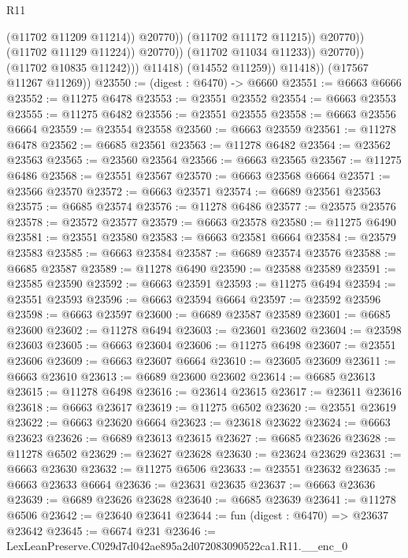 \begin{lexlean}{R11}
\begin{coremodule}
                                          (@11702 @11209 @11214))
                                        @20770))
                                    (@11702 @11172 @11215))
                                  @20770))
                              (@11702 @11129 @11224))
                            @20770))
                        (@11702 @11034 @11233))
                      @20770))
                  (@11702 @10835 @11242)))
              @11418)
            (@14552 @11259))
          @11418))
      (@17567 @11267 @11269))
@23550 := (digest : @6470) -> @6660
@23551 := @6663 @6666
@23552 := @11275 @6478
@23553 := @23551 @23552
@23554 := @6663 @23553
@23555 := @11275 @6482
@23556 := @23551 @23555
@23558 := @6663 @23556 @6664
@23559 := @23554 @23558
@23560 := @6663 @23559
@23561 := @11278 @6478
@23562 := @6685 @23561
@23563 := @11278 @6482
@23564 := @23562 @23563
@23565 := @23560 @23564
@23566 := @6663 @23565
@23567 := @11275 @6486
@23568 := @23551 @23567
@23570 := @6663 @23568 @6664
@23571 := @23566 @23570
@23572 := @6663 @23571
@23574 := @6689 @23561 @23563
@23575 := @6685 @23574
@23576 := @11278 @6486
@23577 := @23575 @23576
@23578 := @23572 @23577
@23579 := @6663 @23578
@23580 := @11275 @6490
@23581 := @23551 @23580
@23583 := @6663 @23581 @6664
@23584 := @23579 @23583
@23585 := @6663 @23584
@23587 := @6689 @23574 @23576
@23588 := @6685 @23587
@23589 := @11278 @6490
@23590 := @23588 @23589
@23591 := @23585 @23590
@23592 := @6663 @23591
@23593 := @11275 @6494
@23594 := @23551 @23593
@23596 := @6663 @23594 @6664
@23597 := @23592 @23596
@23598 := @6663 @23597
@23600 := @6689 @23587 @23589
@23601 := @6685 @23600
@23602 := @11278 @6494
@23603 := @23601 @23602
@23604 := @23598 @23603
@23605 := @6663 @23604
@23606 := @11275 @6498
@23607 := @23551 @23606
@23609 := @6663 @23607 @6664
@23610 := @23605 @23609
@23611 := @6663 @23610
@23613 := @6689 @23600 @23602
@23614 := @6685 @23613
@23615 := @11278 @6498
@23616 := @23614 @23615
@23617 := @23611 @23616
@23618 := @6663 @23617
@23619 := @11275 @6502
@23620 := @23551 @23619
@23622 := @6663 @23620 @6664
@23623 := @23618 @23622
@23624 := @6663 @23623
@23626 := @6689 @23613 @23615
@23627 := @6685 @23626
@23628 := @11278 @6502
@23629 := @23627 @23628
@23630 := @23624 @23629
@23631 := @6663 @23630
@23632 := @11275 @6506
@23633 := @23551 @23632
@23635 := @6663 @23633 @6664
@23636 := @23631 @23635
@23637 := @6663 @23636
@23639 := @6689 @23626 @23628
@23640 := @6685 @23639
@23641 := @11278 @6506
@23642 := @23640 @23641
@23644 := fun (digest : @6470) => @23637 @23642
@23645 := @6674 @231
@23646 := LexLeanPreserve.C029d7d042ae895a2d072083090522ca1.R11.__enc_0

\end{coremodule}
\end{lexlean}

